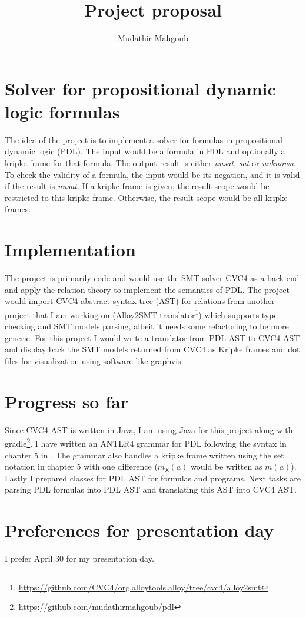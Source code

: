 \documentclass[12pt,a4paper]{article}
\author{Mudathir Mahgoub}
\title{Project proposal}
\begin{document}
\maketitle

\section{Solver for propositional dynamic logic formulas}
The idea of the project is to implement a solver for formulas in propositional dynamic logic (PDL). The input would be a formula in PDL and optionally a kripke frame for that formula. The output result is either \textit{unsat}, \textit{sat} or \textit{unknown}. To check the validity of a formula, the input would be its negation, and it is valid if the result is \textit{unsat}. If a kripke frame is given, the result scope would be restricted to this kripke frame. Otherwise, the result scope would be all kripke frames. 

\section{Implementation}
The project is primarily code and would use the SMT solver CVC4 as a back end and apply the relation theory to implement the semantics of PDL. The project would import CVC4 abstract syntax tree (AST) for relations from another project that I am working on (Alloy2SMT translator\footnote{\url{https://github.com/CVC4/org.alloytools.alloy/tree/cvc4/alloy2smt}}) which supports type checking and SMT models parsing, albeit it needs some refactoring to be more generic.  For this project I would write a translator from PDL AST to CVC4 AST and display back the SMT models returned from CVC4 as Kripke frames and dot files for visualization using software like graphvis.

\section{Progress so far}

Since CVC4 AST is written in Java, I am using Java for this project along with  gradle\footnote{\url{https://github.com/mudathirmahgoub/pdl}}. I have written an ANTLR4 grammar for PDL following the syntax in chapter 5 in \cite{dynamic}. The grammar also handles a kripke frame written using the set notation in chapter 5 with one difference ($m_{\mathfrak{K}}(a)$ would be written as $m(a)$). Lastly I  prepared classes for PDL AST for formulas and programs. Next tasks are parsing PDL formulas  into PDL AST and translating this AST into CVC4 AST. 

\section{Preferences for presentation day}
I prefer April 30 for my presentation day.




\end{document}
